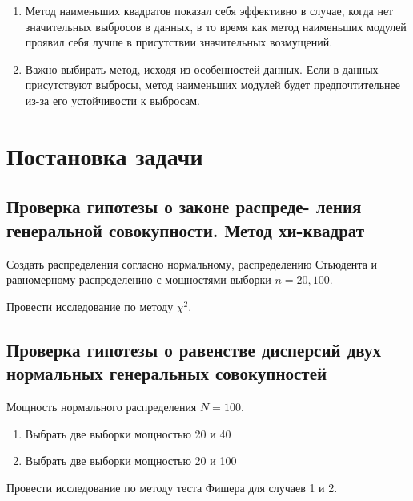 \documentclass[12pt,a4paper]{article}
\begin{document}
	\begin{enumerate}
		\item Метод наименьших квадратов показал себя эффективно в случае,
		когда нет значительных выбросов в данных, в то время как метод
		наименьших модулей проявил себя лучше в присутствии значительных
		возмущений.
		\item Важно выбирать метод, исходя из особенностей данных. Если в
		данных присутствуют выбросы, метод наименьших модулей будет
		предпочтительнее из-за его устойчивости к выбросам.
	\end{enumerate}

	\section{Постановка задачи}

	\subsection{Проверка гипотезы о законе распреде- ления генеральной
		совокупности. Метод хи-квадрат}

	Создать распределения согласно нормальному, распределению Стьюдента и
	равномерному распределению с мощностями выборки \( n=20, 100 \).

	Провести исследование по методу \( \chi^2 \).

	\subsection{Проверка гипотезы о равенстве дисперсий двух нормальных
		генеральных совокупностей}

		Мощность нормального распределения \( N = 100 \).

		\begin{enumerate}
			\item Выбрать две выборки мощностью 20 и 40
			\item Выбрать две выборки мощностью 20 и 100
		\end{enumerate}

		Провести исследование по методу теста Фишера для случаев 1 и 2.
\end{document}
